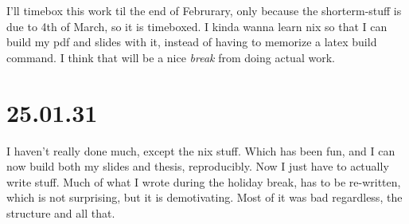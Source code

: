 I'll timebox this work til the end of Februrary, only because the shorterm-stuff
is due to 4th of March, so it is timeboxed. I kinda wanna learn nix so that I
can build my pdf and slides with it, instead of having to memorize a latex build
command. I think that will be a nice \textit{break} from doing actual work.

\section{25.01.31}

I haven't really done much, except the nix stuff. Which has been fun, and I can
now build both my slides and thesis, reproducibly. Now I just have to actually
write stuff. Much of what I wrote during the holiday break, has to be
re-written, which is not surprising, but it is demotivating. Most of it was bad
regardless, the structure and all that.
